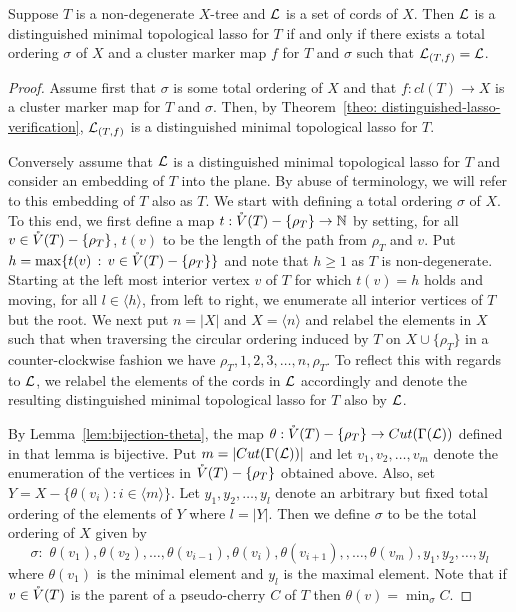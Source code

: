 \begin{thm}
  \label{theo:characterization}
  Suppose $T$ is a non-degenerate $X$-tree and ${\mathcal L}$ is a set of cords of
  $X$. Then ${\mathcal L}$ is a distinguished minimal topological lasso for $T$ if and
  only if there exists a total ordering $\sigma$ of $X$ and a cluster marker
  map $f$ for $T$ and $\sigma$ such that ${\mathcal L}_{(T,f)}={\mathcal L}$.
\end{thm}
\begin{proof}
  Assume first that $\sigma$ is some total ordering of $X$ and that
  $f:cl(T)\to X$ is a cluster marker map for $T$ and $\sigma$. Then, by
  Theorem~\ref{theo: distinguished-lasso-verification}, ${\mathcal L}_{(T,f)}$ is a
  distinguished minimal topological lasso for $T$.

  Conversely assume that ${\mathcal L}$ is a distinguished minimal topological lasso
  for $T$ and consider an embedding of $T$ into the plane.  By abuse of
  terminology, we will refer to this embedding of $T$ also as $T$.  We start
  with defining a total ordering $\sigma$ of $X$.  To this end, we first
  define a map $t:\mathring{V}(T)-\{\rho_T\}\to \mathbb N$ by setting, for all $v\in
  \mathring{V}(T)-\{\rho_T\}$, $t(v)$ to be the length of the path from $\rho_T$ and
  $v$. Put $h=\max\{t(v)\,:\, v\in \mathring{V}(T)-\{\rho_T\}\}$ and note that $h\geq
  1$ as $T$ is non-degenerate.
  Starting at the left most interior vertex $v$ of $T$ for which $t(v)=h$
  holds and moving, for all $l \in \langle h\rangle$, from left to right, we
  enumerate all interior vertices of $T$ but the root. We next put $n=|X|$ and
  $X=\langle n\rangle$ and relabel the elements in $X$ such that when
  traversing the circular ordering induced by $T$ on $X\cup\{\rho_T\}$ in a
  counter-clockwise fashion we have $\rho_T,1,2,3,\ldots, n,\rho_T$. To
  reflect this with regards to ${\mathcal L}$, we relabel the elements of the cords in
  ${\mathcal L}$ accordingly and denote the resulting distinguished minimal topological
  lasso for $T$ also by ${\mathcal L}$.

  By Lemma~\ref{lem:bijection-theta}, the map $\theta :\mathring{V}(T)-\{\rho_T\} \to
  Cut(\Gamma({\mathcal L}))$ defined in that lemma is bijective. Put
  $m=|Cut(\Gamma({\mathcal L}))|$ and let $v_1,v_2,\ldots, v_m$ denote the enumeration
  of the vertices in $\mathring{V}(T)-\{\rho_T\}$ obtained above. Also, set
  $Y=X-\{\theta(v_i): i\in \langle m\rangle\}$. Let $y_1,y_2,\ldots, y_l$
  denote an arbitrary but fixed total ordering of the elements of $Y$ where
  $l=|Y|$. Then we define $\sigma$ to be the total ordering of $X$ given by
$$
\sigma:\,\, \theta(v_1),\theta(v_2),\ldots, \theta(v_{i-1}),
\theta(v_i),\theta(v_{i+1}),
,\ldots, \theta(v_m),y_1,y_2,\ldots, y_l
$$ 
where $\theta(v_1)$ is the minimal element and $y_l$ is the maximal element.
Note that if $v\in \mathring{V}(T)$ is the parent of a pseudo-cherry $C$ of $T$ then
$\theta(v)=\min_{\sigma}C$.



\end{proof}
